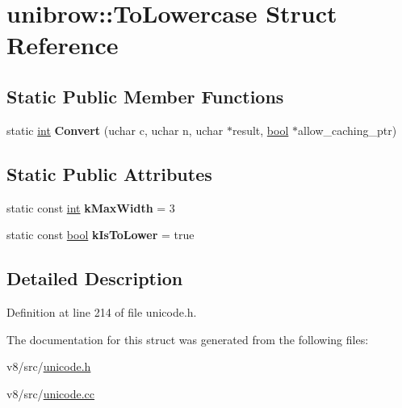 \hypertarget{structunibrow_1_1ToLowercase}{}\section{unibrow\+:\+:To\+Lowercase Struct Reference}
\label{structunibrow_1_1ToLowercase}
\subsection*{Static Public Member Functions}
\begin{DoxyCompactItemize}
\item 
\mbox{\label{structunibrow_1_1ToLowercase_a3dee260f86f4c06840bd71d2bb2f2345}} 
static \mbox{\hyperlink{classint}{int}} {\bfseries Convert} (uchar c, uchar n, uchar $\ast$result, \mbox{\hyperlink{classbool}{bool}} $\ast$allow\+\_\+caching\+\_\+ptr)
\end{DoxyCompactItemize}
\subsection*{Static Public Attributes}
\begin{DoxyCompactItemize}
\item 
\mbox{\label{structunibrow_1_1ToLowercase_a6e41e8feb6ea32c6a4737764fc948b21}} 
static const \mbox{\hyperlink{classint}{int}} {\bfseries k\+Max\+Width} = 3
\item 
\mbox{\label{structunibrow_1_1ToLowercase_a225c76e5328e1c3bdb96438b0f751f44}} 
static const \mbox{\hyperlink{classbool}{bool}} {\bfseries k\+Is\+To\+Lower} = true
\end{DoxyCompactItemize}


\subsection{Detailed Description}


Definition at line 214 of file unicode.\+h.



The documentation for this struct was generated from the following files\+:\begin{DoxyCompactItemize}
\item 
v8/src/\mbox{\hyperlink{unicode_8h}{unicode.\+h}}\item 
v8/src/\mbox{\hyperlink{unicode_8cc}{unicode.\+cc}}\end{DoxyCompactItemize}
